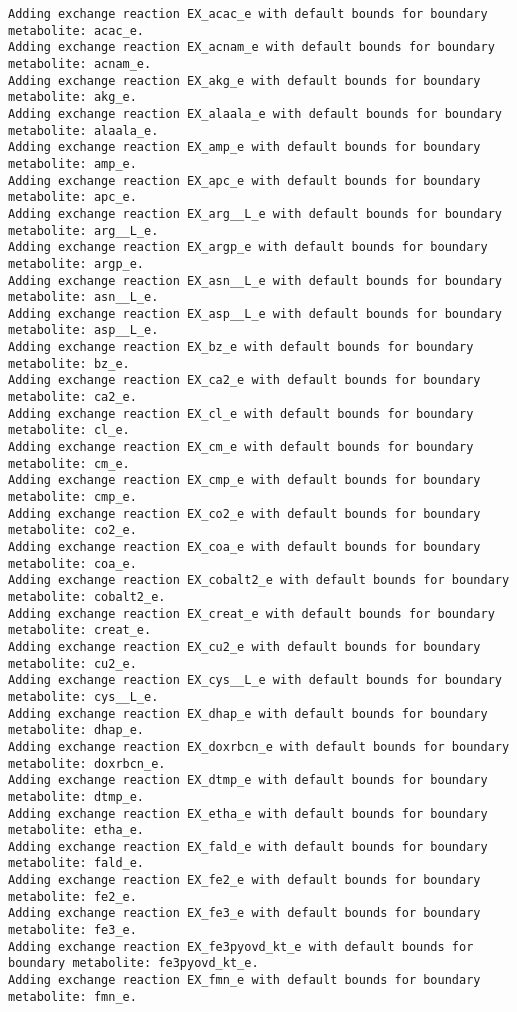 \documentclass[
  letterpaper,
  DIV=11,
  numbers=noendperiod]{scrartcl}
\begin{document}
\begin{verbatim}
Adding exchange reaction EX_acac_e with default bounds for boundary metabolite: acac_e.
Adding exchange reaction EX_acnam_e with default bounds for boundary metabolite: acnam_e.
Adding exchange reaction EX_akg_e with default bounds for boundary metabolite: akg_e.
Adding exchange reaction EX_alaala_e with default bounds for boundary metabolite: alaala_e.
Adding exchange reaction EX_amp_e with default bounds for boundary metabolite: amp_e.
Adding exchange reaction EX_apc_e with default bounds for boundary metabolite: apc_e.
Adding exchange reaction EX_arg__L_e with default bounds for boundary metabolite: arg__L_e.
Adding exchange reaction EX_argp_e with default bounds for boundary metabolite: argp_e.
Adding exchange reaction EX_asn__L_e with default bounds for boundary metabolite: asn__L_e.
Adding exchange reaction EX_asp__L_e with default bounds for boundary metabolite: asp__L_e.
Adding exchange reaction EX_bz_e with default bounds for boundary metabolite: bz_e.
Adding exchange reaction EX_ca2_e with default bounds for boundary metabolite: ca2_e.
Adding exchange reaction EX_cl_e with default bounds for boundary metabolite: cl_e.
Adding exchange reaction EX_cm_e with default bounds for boundary metabolite: cm_e.
Adding exchange reaction EX_cmp_e with default bounds for boundary metabolite: cmp_e.
Adding exchange reaction EX_co2_e with default bounds for boundary metabolite: co2_e.
Adding exchange reaction EX_coa_e with default bounds for boundary metabolite: coa_e.
Adding exchange reaction EX_cobalt2_e with default bounds for boundary metabolite: cobalt2_e.
Adding exchange reaction EX_creat_e with default bounds for boundary metabolite: creat_e.
Adding exchange reaction EX_cu2_e with default bounds for boundary metabolite: cu2_e.
Adding exchange reaction EX_cys__L_e with default bounds for boundary metabolite: cys__L_e.
Adding exchange reaction EX_dhap_e with default bounds for boundary metabolite: dhap_e.
Adding exchange reaction EX_doxrbcn_e with default bounds for boundary metabolite: doxrbcn_e.
Adding exchange reaction EX_dtmp_e with default bounds for boundary metabolite: dtmp_e.
Adding exchange reaction EX_etha_e with default bounds for boundary metabolite: etha_e.
Adding exchange reaction EX_fald_e with default bounds for boundary metabolite: fald_e.
Adding exchange reaction EX_fe2_e with default bounds for boundary metabolite: fe2_e.
Adding exchange reaction EX_fe3_e with default bounds for boundary metabolite: fe3_e.
Adding exchange reaction EX_fe3pyovd_kt_e with default bounds for boundary metabolite: fe3pyovd_kt_e.
Adding exchange reaction EX_fmn_e with default bounds for boundary metabolite: fmn_e.

\end{verbatim}
\end{document}
